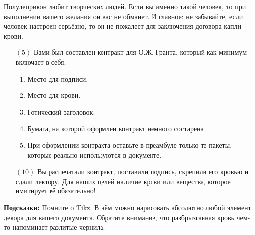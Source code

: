 \documentclass[12pt, a4paper, oneside]{article}
\begin{document}
Полулеприкон любит творческих людей. Если вы именно такой человек, то при выполнении вашего желания он вас не обманет. И главное: не забывайте, если человек настроен серьёзно, то он не пожалеет для заключения договора капли крови.

\begin{itemize}
\item[$(5)$]   Вами был составлен контракт для О.Ж. Гранта, который как минимум включает в себя:

\begin{enumerate}
\item  Место для подписи.
\item  Место для крови.
\item  Готический заголовок.
\item  Бумага, на которой оформлен контракт немного состарена.
\item  При оформлении контракта оставьте в преамбуле только те пакеты, которые реально используются в документе.
\end{enumerate}

\item[$(10)$] Вы распечатали контракт, поставили подпись, скрепили его кровью и сдали лектору. Для наших целей наличие крови или вещества, которое имитирует её обязательно!
\end{itemize}

\textbf{Подсказки:}  Помните о Tikz. В нём можно нарисовать абсолютно любой элемент декора для вашего документа. Обратите внимание, что разбрызганная кровь чем-то напоминает разлитые чернила.
\end{document}
